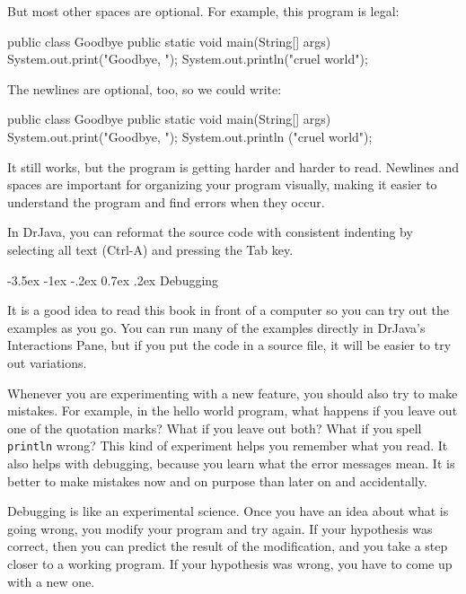 \documentclass[12pt]{book}
\makeatletter
\theoremstyle{exercise}
\newcommand{\java}[1]{\verb"#1"}
\renewcommand{\section}{\@startsection{section}{1}{\z@}%
    {-3.5ex \@plus -1ex \@minus -.2ex}%
    {0.7ex \@plus.2ex}%
    {\normalfont\Large\bfseries}}
\newcommand{\java}[1]{\lstinline{#1}} %
\makeatother
\begin{document}
But most other spaces are optional.
For example, this program is legal:

\begin{code}
public class Goodbye {
public static void main(String[] args) {
System.out.print("Goodbye, ");
System.out.println("cruel world");
}
}
\end{code}

The newlines are optional, too, so we could write:

\begin{code}
public class Goodbye { public static void main(String[] args) {
System.out.print("Goodbye, "); System.out.println
("cruel world");}}
\end{code}

It still works, but the program is getting harder and harder to read.
Newlines and spaces are important for organizing your program visually, making it easier to understand the program and find errors when they occur.

In DrJava, you can reformat the source code with consistent indenting by selecting all text (Ctrl-A) and pressing the Tab key.


\section{Debugging}
\label{sec:examples}

It is a good idea to read this book in front of a computer so you can try out the examples as you go.
You can run many of the examples directly in DrJava's Interactions Pane, but if you put the code in a source file, it will be easier to try out variations.

Whenever you are experimenting with a new feature, you should also try to make mistakes.
For example, in the hello world program, what happens if you leave out one of the quotation marks?
What if you leave out both?
What if you spell \java{println} wrong?
This kind of experiment helps you remember what you read.
It also helps with debugging, because you learn what the error messages mean.
It is better to make mistakes now and on purpose than later on and accidentally.



Debugging is like an experimental science.
Once you have an idea about what is going wrong, you modify your program and try again.
If your hypothesis was correct, then you can predict the result of the modification, and you take a step closer to a working program.
If your hypothesis was wrong, you have to come up with a new one.
\end{document}
